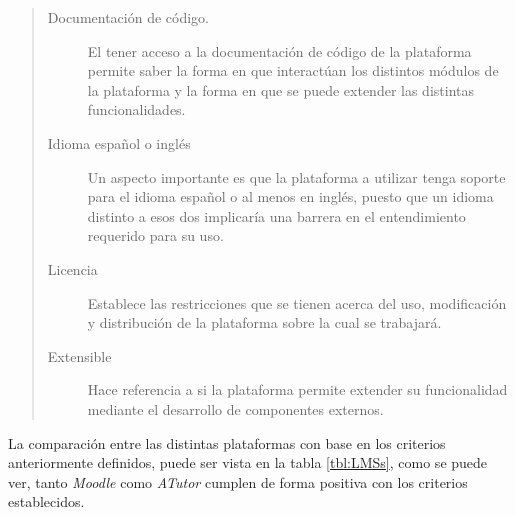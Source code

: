     \begin{quote}
    \begin{description}
    \item[Documentación de código.] El tener acceso a la documentación de código de
            la plataforma permite saber la forma en que interactúan los distintos
            módulos de la plataforma y la forma en que se puede extender las distintas
            funcionalidades.

    \item[Idioma español o inglés] Un aspecto importante es que la plataforma a utilizar
            tenga soporte para el idioma español o al menos en inglés, puesto que un
            idioma distinto a esos dos implicaría una barrera en el entendimiento requerido
            para su uso.

    \item[Licencia] Establece las restricciones que se tienen acerca del uso, modificación
            y distribución de la plataforma sobre la cual se trabajará.

    \item[Extensible] Hace referencia a si la plataforma permite extender su funcionalidad
            mediante el desarrollo de componentes externos.
    \end{description}
    \end{quote}

 \noindent La comparación entre las distintas plataformas con base en los criterios
 anteriormente definidos, puede ser vista en la tabla \ref{tbl:LMSs}, como se puede
 ver, tanto {\it Moodle} como {\it ATutor} cumplen de forma positiva con los criterios
 establecidos.

 \clearpage



